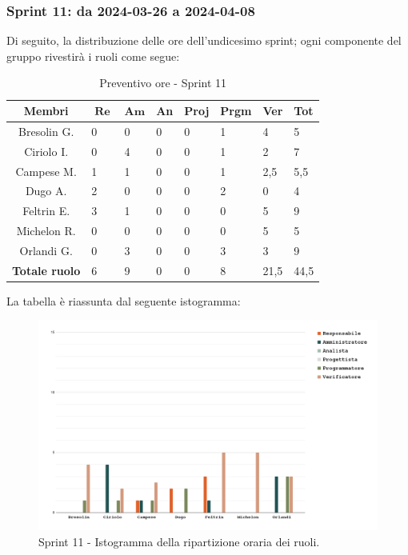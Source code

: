 \documentclass[10pt, a4paper]{article}
\begin{document}
{{{{{{{{{{{{{{{{{{\subsubsection{Sprint 11: da 2024-03-26 a 2024-04-08}
Di seguito, la distribuzione delle ore dell'undicesimo sprint; ogni componente del gruppo rivestirà i ruoli come segue:
\begin{table}[H]
\begin{tabularx}{\textwidth}{c|X|X|X|X|X|X|X}
        \textbf{Membri} & $\operatorname{\textbf{Re}}$ & $\mathrm{\textbf{Am}}$ & \textbf{An} & \textbf{Proj} & \textbf{Prgm} & \textbf{Ver} & \textbf{Tot} \\
        \hline Bresolin G. & 0 & 0 & 0 & 0 & 1 & \cellcolor{primarycolor}4 & 5 \\
        \hline Ciriolo I.  & 0 & \cellcolor{primarycolor}4 & 0 & 0 & 1 & 2 & 7 \\
        \hline Campese M.  & 1 & 1 & 0 & 0 & 1 & \cellcolor{primarycolor}2,5 & 5,5 \\
        \hline Dugo A.     & \cellcolor{primarycolor}2 & 0 & 0 & 0 & 2 & 0 & 4 \\
        \hline Feltrin E.  & 3 & 1 & 0 & 0 & 0 & \cellcolor{primarycolor}5 & 9 \\
        \hline Michelon R. & 0 & 0 & 0 & 0 & 0 & \cellcolor{primarycolor}5 & 5 \\
        \hline Orlandi G.  & 0 & 3 & 0 & 0 & \cellcolor{primarycolor}3 & 3 & 9 \\
        \hline
        \textbf{Totale ruolo} & 6 & 9 & 0 & 0 & 8 & 21,5 & 44,5 
    \end{tabularx}
    \caption{Preventivo ore - Sprint 11}
\end{table}

La tabella è riassunta dal seguente istogramma:
\begin{figure}[H]
        \centering        
        \includegraphics[width=15.5cm]{istogrammi/istogramma_11_periodo.png}
        \caption{Sprint 11 - Istogramma della ripartizione oraria dei ruoli. }
\end{figure}

}}}}}}}}}}}}}}}}}}
\end{document}
